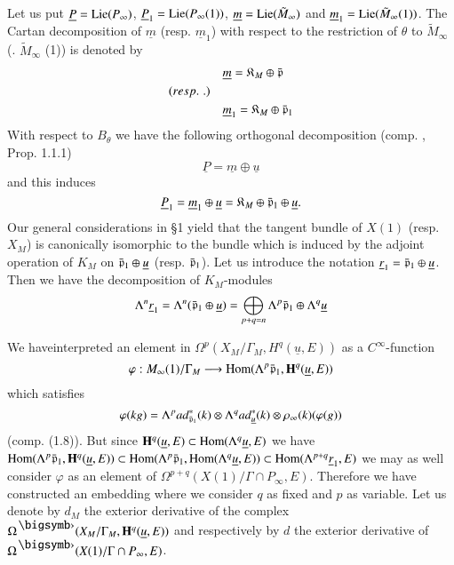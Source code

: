 Let us put $\underline{P} = \operatorname{Lie} (P_\infty)$, $\underline{P}_1 = \operatorname{Lie} (P_\infty (1))$, $\underline{m} = \operatorname{Lie} (\tilde{M}_\infty)$ and $\underline{m}_1 = \operatorname{Lie} (\tilde{M}_\infty (1))$. The Cartan decomposition of $\underline{m}$ (resp. $\underline{m}_1$) with respect to the restriction of $\theta$ to $\tilde{M}_\infty$ (\resp. $\tilde{M}_\infty$ (1)) is denoted by 
\begin{align*}
& \underline{m} = \mathfrak{K}_M \oplus \bar{\mathfrak{p}}\\
({resp.}\kern.3em.) \quad & \\
& \underline{m}_1 = \mathfrak{K}_M \oplus \bar{\mathfrak{p}}_1
\end{align*}
With respect to $B_\theta$ we have the following orthogonal decomposition (comp. \cite{art5-key6}, Prop. 1.1.1)
$$
\underline{P} = \underline{m} \oplus \underline{u}
$$
and this induces 
$$
\underline{P}_1 = \underline{m}_1 \oplus \underline{u} = \mathfrak{K}_M \oplus \bar{\mathfrak{p}}_1 \oplus \underline{u}.
$$
Our general considerations in \S 1 yield that the tangent bundle of $X(1)$ (resp. $X_M$) is canonically isomorphic to the bundle which is induced by the adjoint operation of $K_M$ on $\bar{\mathfrak{p}}_1 \oplus \underline{u}$ (resp. $\bar{\mathfrak{p}}_1$). Let us introduce the notation $\underline{r}_1 = \bar{\mathfrak{p}}_1 \oplus \underline{u}$. Then we have the decomposition of $K_M$-modules
$$
\Lambda^n \underline{r}_1 = \Lambda^n (\bar{\mathfrak{p}}_1 \oplus \underline{u}) = \bigoplus_{p+q=n} \Lambda^p \bar{\mathfrak{p}}_1 \oplus \Lambda^q \underline{u}
$$

We have\pageoriginale interpreted an element in $\Omega^p (X_M/ \Gamma_M, H^q (\underline{u}, E))$ as a $C^\infty$-function
$$
\varphi : M_\infty (1) / \Gamma_M \longrightarrow \operatorname{Hom} (\Lambda^p \bar{\mathfrak{p}}_1, \mathbf{H}^q (\underline{u}, E))
$$
which satisfies 
$$
\varphi (kg) = \Lambda^p ad^\ast_{\bar{\mathfrak{p}}_1} (k)\otimes \Lambda^q ad^\ast_{\underline{u}} (k) \otimes \rho_\infty (k) (\varphi (g))
 $$
(comp. (1.8)). But since $\mathbf{H}^q (\underline{u}, E) \subset \operatorname{Hom} (\Lambda^q \underline{u}, E)$ we have $\operatorname{Hom} (\Lambda^p \bar{\mathfrak{p}}_1, \mathbf{H}^q (\underline{u}, E)) \subset \operatorname{Hom} (\Lambda^p \bar{\mathfrak{p}}_1, \operatorname{Hom} (\Lambda^q \underline{u}, E)) \subset \operatorname{Hom} (\Lambda^{p+q}  \underline{r}_1, E)$ we may as well consider $\varphi$ as an element of $\Omega^{p+q} (X (1)/ \Gamma \cap P_\infty, E)$. Therefore we have constructed an embedding where we consider $q$ as fixed and $p$ as variable. Let us denote by $d_M$ the exterior derivative of the complex $\Omega^\bigdot (X_M / \Gamma _M, \bH^q (\underline{u}, E))$ and respectively by $d$ the exterior derivative of $\Omega^\bigdot (X (1)/ \Gamma \cap P_\infty, E)$.

